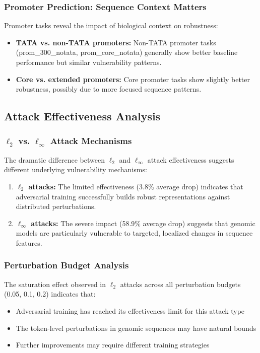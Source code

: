 \documentclass{article} %
\begin{document}
\subsubsection{Promoter Prediction: Sequence Context Matters}

Promoter tasks reveal the impact of biological context on robustness:
\begin{itemize}
    \item \textbf{TATA vs. non-TATA promoters:} Non-TATA promoter tasks (prom\_300\_notata, prom\_core\_notata) generally show better baseline performance but similar vulnerability patterns.
    \item \textbf{Core vs. extended promoters:} Core promoter tasks show slightly better robustness, possibly due to more focused sequence patterns.
\end{itemize}

\subsection{Attack Effectiveness Analysis}

\subsubsection{$\ell_2$ vs. $\ell_\infty$ Attack Mechanisms}

The dramatic difference between $\ell_2$ and $\ell_\infty$ attack effectiveness suggests different underlying vulnerability mechanisms:

\begin{enumerate}
    \item \textbf{$\ell_2$ attacks:} The limited effectiveness (3.8\% average drop) indicates that adversarial training successfully builds robust representations against distributed perturbations.
    
    \item \textbf{$\ell_\infty$ attacks:} The severe impact (58.9\% average drop) suggests that genomic models are particularly vulnerable to targeted, localized changes in sequence features.
\end{enumerate}

\subsubsection{Perturbation Budget Analysis}

The saturation effect observed in $\ell_2$ attacks across all perturbation budgets (0.05, 0.1, 0.2) indicates that:
\begin{itemize}
    \item Adversarial training has reached its effectiveness limit for this attack type
    \item The token-level perturbations in genomic sequences may have natural bounds
    \item Further improvements may require different training strategies
\end{itemize}
\end{document}
